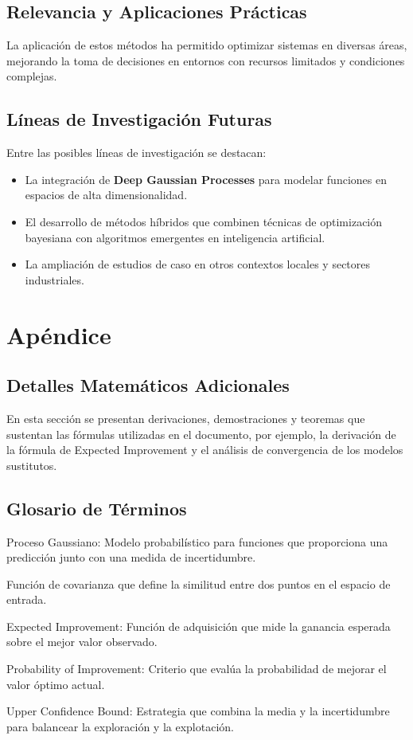 \documentclass[12pt]{article}
\begin{document}
	\subsection{Relevancia y Aplicaciones Prácticas}
	La aplicación de estos métodos ha permitido optimizar sistemas en diversas áreas, mejorando la toma de decisiones en entornos con recursos limitados y condiciones complejas.  
	\lipsum[27]
	
	\subsection{Líneas de Investigación Futuras}
	Entre las posibles líneas de investigación se destacan:
	\begin{itemize}[leftmargin=1.5cm]
		\item La integración de \textbf{Deep Gaussian Processes} para modelar funciones en espacios de alta dimensionalidad.
		\item El desarrollo de métodos híbridos que combinen técnicas de optimización bayesiana con algoritmos emergentes en inteligencia artificial.
		\item La ampliación de estudios de caso en otros contextos locales y sectores industriales.
	\end{itemize}
	\lipsum[28]
	
	\section*{Apéndice}
	
	\subsection{Detalles Matemáticos Adicionales}
	En esta sección se presentan derivaciones, demostraciones y teoremas que sustentan las fórmulas utilizadas en el documento, por ejemplo, la derivación de la fórmula de Expected Improvement y el análisis de convergencia de los modelos sustitutos.
	\lipsum[29-31]
	
	\subsection{Glosario de Términos}
	\begin{description}[leftmargin=1.5cm]
		\item[GP] Proceso Gaussiano: Modelo probabilístico para funciones que proporciona una predicción junto con una medida de incertidumbre.
		\item[Kernel] Función de covarianza que define la similitud entre dos puntos en el espacio de entrada.
		\item[EI] Expected Improvement: Función de adquisición que mide la ganancia esperada sobre el mejor valor observado.
		\item[PI] Probability of Improvement: Criterio que evalúa la probabilidad de mejorar el valor óptimo actual.
		\item[UCB] Upper Confidence Bound: Estrategia que combina la media y la incertidumbre para balancear la exploración y la explotación.
	\end{description}
	
\end{document}
